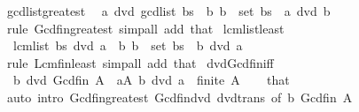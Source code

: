 \begin{isabellebody}
\endisatagproof
{\isafoldproof}%
%
\isadelimproof
\isanewline
%
\endisadelimproof
\isanewline
{}\isamarkupfalse%
\ gcd{\isacharunderscore}{\kern0pt}list{\isacharunderscore}{\kern0pt}greatest{\isacharcolon}{\kern0pt}\isanewline
\ \ {\isachardoublequoteopen}a\ dvd\ gcd{\isacharunderscore}{\kern0pt}list\ bs{\isachardoublequoteclose}\ \ {\isachardoublequoteopen}{\isasymAnd}b{\isachardot}{\kern0pt}\ b\ {\isasymin}\ set\ bs\ {\isasymLongrightarrow}\ a\ dvd\ b{\isachardoublequoteclose}\isanewline
%
\isadelimproof
\ \ %
\endisadelimproof
%
\isatagproof
{}\isamarkupfalse%
\ {\isacharparenleft}{\kern0pt}rule\ Gcd{\isacharunderscore}{\kern0pt}fin{\isacharunderscore}{\kern0pt}greatest{\isacharparenright}{\kern0pt}\ {\isacharparenleft}{\kern0pt}simp{\isacharunderscore}{\kern0pt}all\ add{\isacharcolon}{\kern0pt}\ that{\isacharparenright}{\kern0pt}%
\endisatagproof
{\isafoldproof}%
%
\isadelimproof
\isanewline
%
\endisadelimproof
\isanewline
{}\isamarkupfalse%
\ lcm{\isacharunderscore}{\kern0pt}list{\isacharunderscore}{\kern0pt}least{\isacharcolon}{\kern0pt}\isanewline
\ \ {\isachardoublequoteopen}lcm{\isacharunderscore}{\kern0pt}list\ bs\ dvd\ a{\isachardoublequoteclose}\ \ {\isachardoublequoteopen}{\isasymAnd}b{\isachardot}{\kern0pt}\ b\ {\isasymin}\ set\ bs\ {\isasymLongrightarrow}\ b\ dvd\ a{\isachardoublequoteclose}\isanewline
%
\isadelimproof
\ \ %
\endisadelimproof
%
\isatagproof
{}\isamarkupfalse%
\ {\isacharparenleft}{\kern0pt}rule\ Lcm{\isacharunderscore}{\kern0pt}fin{\isacharunderscore}{\kern0pt}least{\isacharparenright}{\kern0pt}\ {\isacharparenleft}{\kern0pt}simp{\isacharunderscore}{\kern0pt}all\ add{\isacharcolon}{\kern0pt}\ that{\isacharparenright}{\kern0pt}%
\endisatagproof
{\isafoldproof}%
%
\isadelimproof
\isanewline
%
\endisadelimproof
\isanewline
{}\isamarkupfalse%
\ dvd{\isacharunderscore}{\kern0pt}Gcd{\isacharunderscore}{\kern0pt}fin{\isacharunderscore}{\kern0pt}iff{\isacharcolon}{\kern0pt}\isanewline
\ \ {\isachardoublequoteopen}b\ dvd\ Gcd\isactrlsub f\isactrlsub i\isactrlsub n\ A\ {\isasymlongleftrightarrow}\ {\isacharparenleft}{\kern0pt}{\isasymforall}a{\isasymin}A{\isachardot}{\kern0pt}\ b\ dvd\ a{\isacharparenright}{\kern0pt}{\isachardoublequoteclose}\ \ {\isachardoublequoteopen}finite\ A{\isachardoublequoteclose}\isanewline
%
\isadelimproof
\ \ %
\endisadelimproof
%
\isatagproof
{}\isamarkupfalse%
\ that\ \isamarkupfalse%
\ {\isacharparenleft}{\kern0pt}auto\ intro{\isacharcolon}{\kern0pt}\ Gcd{\isacharunderscore}{\kern0pt}fin{\isacharunderscore}{\kern0pt}greatest\ Gcd{\isacharunderscore}{\kern0pt}fin{\isacharunderscore}{\kern0pt}dvd\ dvd{\isacharunderscore}{\kern0pt}trans\ {\isacharbrackleft}{\kern0pt}of\ b\ {\isachardoublequoteopen}Gcd\isactrlsub f\isactrlsub i\isactrlsub n\ A{\isachardoublequoteclose}{\isacharbrackright}{\kern0pt}{\isacharparenright}{\kern0pt}%

\end{isabellebody}
